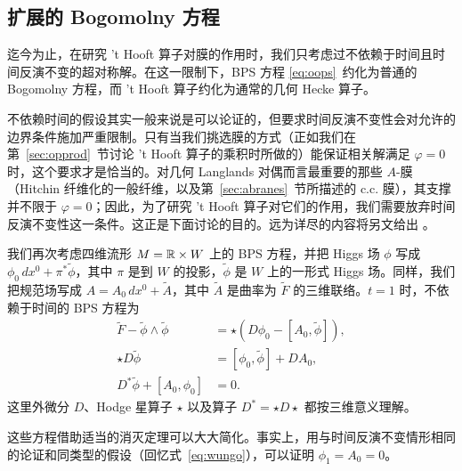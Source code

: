 
\subsection{扩展的 Bogomolny 方程}

\label{sec:extbog}

迄今为止，在研究 't Hooft 算子对膜的作用时，我们只考虑过不依赖于时间且时间反演不变的超对称解。在这一限制下，BPS 方程 \eqref{eq:oops}\ 约化为普通的 Bogomolny 方程，而 't Hooft 算子约化为通常的几何 Hecke 算子。

不依赖时间的假设其实一般来说是可以论证的，但要求时间反演不变性会对允许的边界条件施加严重限制。只有当我们挑选膜的方式（正如我们在第~\ref{sec:opprod}~节讨论 't Hooft 算子的乘积时所做的）能保证相关解满足 $\varphi=0$ 时，这个要求才是恰当的。对几何 Langlands 对偶而言最重要的那些 $A$-膜（Hitchin 纤维化的一般纤维，以及第~\ref{sec:abranes}~节所描述的 c.c. 膜），其支撑并不限于 $\varphi=0$；因此，为了研究 't Hooft 算子对它们的作用，我们需要放弃时间反演不变性这一条件。这正是下面讨论的目的。远为详尽的内容将另文给出 \cite{ref26}。

我们再次考虑四维流形 $M={\mathbb{R}}\times W$ 上的 BPS 方程，并把 Higgs 场 $\phi$ 写成 $\phi_0\, dx^0 +\pi^*\tilde\phi$，其中 $\pi$ 是到 $W$ 的投影，$\tilde\phi$ 是 $W$ 上的一形式 Higgs 场。同样，我们把规范场写成 $A=A_0\,dx^0+\tilde A$，其中 $\tilde A$ 是曲率为 $\tilde F$ 的三维联络。$t=1$ 时，不依赖于时间的 BPS 方程为
\setcounter{equation}{34}
\begin{equation}\label{eq:BPSstaticgen}
\begin{aligned}\tilde F-\tilde\phi\wedge\tilde\phi&=
\star\left(D\phi_0-[A_0,\tilde\phi]\right),\\ \star
D\tilde\phi&=[\phi_0,\tilde\phi]+D A_0,\\
D^*\tilde\phi+[A_0,\phi_0]&=0.\end{aligned}
\end{equation}
 这里外微分 $D$、Hodge 星算子 $\star$ 以及算子 $D^*=\star D\star$ 都按三维意义理解。

这些方程借助适当的消灭定理可以大大简化。事实上，用与时间反演不变情形相同的论证和同类型的假设（回忆式~\eqref{eq:wungo}），可以证明 $\phi_1=A_0=0$。

